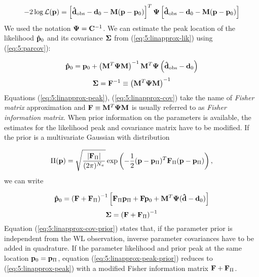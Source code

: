 \begin{equation}
\label{eq:5:linapprox-lik}
-2\log\mathcal{L}(\mathbf{p}) = \left[\mathbf{\hat{d}}_{\rm obs}-\mathbf{d}_0-\mathbf{M}(\mathbf{p}-\mathbf{p}_0)\right]^T\mathbf{\Psi}\left[\mathbf{\hat{d}}_{\rm obs}-\mathbf{d}_0-\mathbf{M}(\mathbf{p}-\mathbf{p}_0)\right]
\end{equation}
%
We used the notation $\mathbf{\Psi}=\mathbf{C}^{-1}$. We can estimate the peak location of the likelihood $\mathbf{\hat{p}}_0$ and its covariance $\mathbf{\Sigma}$ from (\ref{eq:5:linapprox-lik}) using (\ref{eq:5:parcov}):

\begin{equation}
\label{eq:5:linapprox-peak}
\mathbf{\hat{p}}_0 = \mathbf{p}_0 + \left(\mathbf{M}^T\mathbf{\Psi}\mathbf{M}\right)^{-1}\mathbf{M}^T\mathbf{\Psi}\left(\mathbf{\hat{d}}_{\rm obs}-\mathbf{d}_0\right)
\end{equation}
%
\begin{equation}
\label{eq:5:linapprox-cov}
\mathbf{\Sigma} = \mathbf{F}^{-1} \equiv \left(\mathbf{M}^T\mathbf{\Psi}\mathbf{M}\right)^{-1} 
\end{equation}
%
Equations (\ref{eq:5:linapprox-peak}), (\ref{eq:5:linapprox-cov}) take the name of \textit{Fisher matrix} approximation and $\mathbf{F}\equiv\mathbf{M}^T\mathbf{\Psi}\mathbf{M}$ is usually referred to as \textit{Fisher information matrix}. When prior information on the parameters is available, the estimates for the likelihood peak and covariance matrix have to be modified. If the prior is a multivariate Gaussian with distribution

\begin{equation}
\label{eq:5:gaussprior}
\Pi(\mathbf{p}) = \sqrt{\frac{\vert\mathbf{F}_\Pi\vert}{(2\pi)^{N_\pi}}}\exp\left(-\frac{1}{2}(\mathbf{p}-\mathbf{p}_\Pi)^T\mathbf{F}_\Pi(\mathbf{p}-\mathbf{p}_\Pi)\right),
\end{equation}
%
we can write

\begin{equation}
\label{eq:5:linapprox-peak-prior}
\mathbf{\hat{p}}_0 = \left(\mathbf{F}+\mathbf{F}_\Pi\right)^{-1}\left[\mathbf{F}_\Pi\mathbf{p}_\Pi + \mathbf{F}\mathbf{p}_0 + \mathbf{M}^T\mathbf{\Psi}(\mathbf{\hat{d}}-\mathbf{d}_0) \right]
\end{equation}
%
\begin{equation}
\label{eq:5:linapprox-cov-prior}
\mathbf{\Sigma} = \left(\mathbf{F}+\mathbf{F}_\Pi\right)^{-1} 
\end{equation}
%
Equation (\ref{eq:5:linapprox-cov-prior}) states that, if the parameter prior is independent from the WL observation, inverse parameter covariances have to be added in quadrature. If the parameter likelihood and prior peak at the same location $\mathbf{p}_0=\mathbf{p}_\Pi$, equation (\ref{eq:5:linapprox-peak-prior}) reduces to (\ref{eq:5:linapprox-peak}) with a modified Fisher information matrix $\mathbf{F}+\mathbf{F}_\Pi$.    

